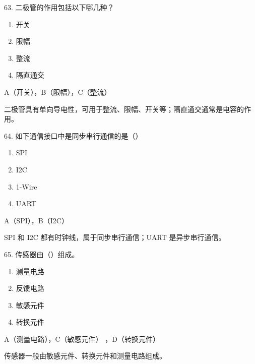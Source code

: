 \begin{question}{63. 二极管的作用包括以下哪几种？}
\begin{enumerate}[label=\Alph*., leftmargin=2.4em, itemsep=0.2em]
\item 开关
\item 限幅
\item 整流
\item 隔直通交
\end{enumerate}
\end{question}
\begin{answer}
A（开关），B（限幅），C（整流）
\end{answer}
\begin{explanation}
二极管具有单向导电性，可用于整流、限幅、开关等；隔直通交通常是电容的作用。
\end{explanation}

\begin{question}{64. 如下通信接口中是同步串行通信的是（）}
\begin{enumerate}[label=\Alph*., leftmargin=2.4em, itemsep=0.2em]
\item SPI
\item I2C
\item 1-Wire
\item UART
\end{enumerate}
\end{question}
\begin{answer}
A（SPI），B（I2C）
\end{answer}
\begin{explanation}
SPI 和 I2C 都有时钟线，属于同步串行通信；UART 是异步串行通信。
\end{explanation}

\begin{question}{65. 传感器由（）组成。}
\begin{enumerate}[label=\Alph*., leftmargin=2.4em, itemsep=0.2em]
\item 测量电路
\item 反馈电路
\item 敏感元件
\item 转换元件
\end{enumerate}
\end{question}
\begin{answer}
A（测量电路），C（敏感元件） ，D（转换元件）
\end{answer}
\begin{explanation}
传感器一般由敏感元件、转换元件和测量电路组成。
\end{explanation}

